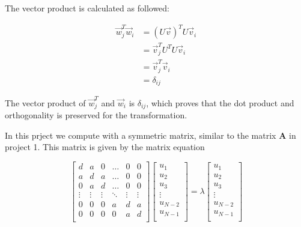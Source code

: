 \documentclass{article}
\begin{document}
The vector product is calculated as followed:

\begin{align*}
  \vec{w}_j ^T \vec{w}_i &= (U \vec{v})^T U \vec{v}_i \\
  &= \vec{v}_j ^T U^T U \vec{v}_i \\
  &= \vec{v}_j ^T \vec{v}_i \\
  &= \delta _{ij}
\end{align*}

The vector product of $\vec{w}_j ^T$ and $\vec{w}_i$ is $\delta_{ij}$, which proves that the dot product and orthogonality is preserved for the transformation.

In this prject we compute with a symmetric matrix, similar to the matrix \textbf{A} in project 1. This matrix is given by the matrix equation

  \begin{equation*}
    \begin{bmatrix}
        d & a & 0 & \dots & 0 & 0 \\
        a & d & a & \dots & 0 & 0 \\
        0 & a & d & \dots & 0 & 0 \\
        \vdots & \vdots & \vdots & \ddots & \vdots & \vdots \\
        0 & 0 & 0 & a & d & a \\
        0 & 0 & 0 & 0 & a & d \\
    \end{bmatrix}
    \begin{bmatrix}
        u_1 \\
        u_2 \\
        u_3 \\
        \vdots \\
        u_{N-2} \\
        u_{N-1} \\
    \end{bmatrix}
      = \lambda
    \begin{bmatrix}
        u_1 \\
        u_2 \\
        u_3 \\
        \vdots \\
        u_{N-2} \\
        u_{N-1} \\
    \end{bmatrix}
  \end{equation*} \\
\end{document}
